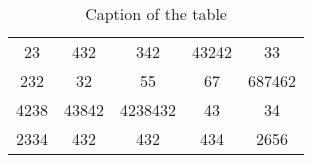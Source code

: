 \begin{table}[htbp]
\centering
\begin{tabular}{||c | c | c | c | c||}
23   & 432   & 342     & 43242 & 33     \\
232  & 32    & 55      & 67    & 687462 \\
4238 & 43842 & 4238432 & 43    & 34     \\
2334 & 432   & 432     & 434   & 2656  
\end{tabular}
\label{tab:random_numbers}
\caption{Caption of the table}
\end{table}
